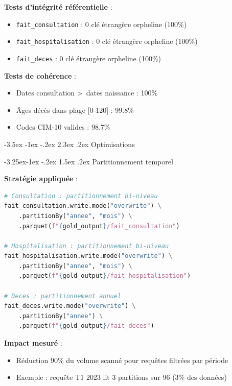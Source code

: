 \documentclass[12pt,a4paper]{article}
\makeatletter
\renewcommand\section{\@startsection{section}{1}{\z@}%
    {-3.5ex \@plus -1ex \@minus -.2ex}%
    {2.3ex \@plus.2ex}%
    {\normalfont\Large\bfseries\color{blue!70!black}}}
\renewcommand\subsection{\@startsection{subsection}{2}{\z@}%
    {-3.25ex\@plus -1ex \@minus -.2ex}%
    {1.5ex \@plus .2ex}%
    {\normalfont\large\bfseries\color{blue!50!black}}}
\makeatother
\begin{document}
\textbf{Tests d'intégrité référentielle} :
\begin{itemize}
\item \texttt{fait\_consultation} : 0 clé étrangère orpheline (100\%)
\item \texttt{fait\_hospitalisation} : 0 clé étrangère orpheline (100\%)
\item \texttt{fait\_deces} : 0 clé étrangère orpheline (100\%)
\end{itemize}

\textbf{Tests de cohérence} :
\begin{itemize}
\item Dates consultation \textgreater\ dates naissance : 100\%
\item Âges décès dans plage [0-120] : 99.8\%
\item Codes CIM-10 valides : 98.7\%
\end{itemize}

\newpage
\section{Optimisations}

\subsection{Partitionnement temporel}

\textbf{Stratégie appliquée} :

\begin{lstlisting}[language=Python, basicstyle=\small\ttfamily]
# Consultation : partitionnement bi-niveau
fait_consultation.write.mode("overwrite") \
    .partitionBy("annee", "mois") \
    .parquet(f"{gold_output}/fait_consultation")

# Hospitalisation : partitionnement bi-niveau
fait_hospitalisation.write.mode("overwrite") \
    .partitionBy("annee", "mois") \
    .parquet(f"{gold_output}/fait_hospitalisation")

# Deces : partitionnement annuel
fait_deces.write.mode("overwrite") \
    .partitionBy("annee") \
    .parquet(f"{gold_output}/fait_deces")
\end{lstlisting}

\textbf{Impact mesuré} :
\begin{itemize}
\item Réduction 90\% du volume scanné pour requêtes filtrées par période
\item Exemple : requête T1 2023 lit 3 partitions sur 96 (3\% des données)
\end{itemize}
\end{document}
